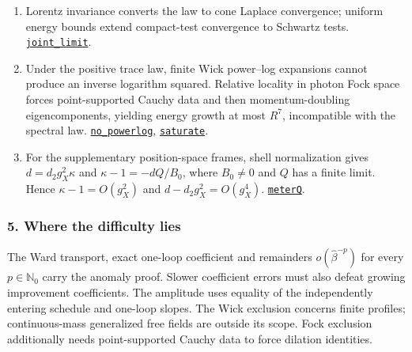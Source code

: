 \documentclass[
  letterpaper,
  11pt]{article}
\begin{document}
\begin{enumerate}
  monotonicity removes lattice rounding and the subsequence principle
  gives the full limit.
  \href{https://github.com/yang-mills-group/OpenAI-YM-20261028/blob/3456e5e75cf8d4cd558955a5c7638fba2d68f464/YM/TraceExtension/Verse/Cape.lean\#L77-L88}{\texttt{outside}}.
\item
  Lorentz invariance converts the law to cone Laplace convergence;
  uniform energy bounds extend compact-test convergence to Schwartz
  tests.
  \href{https://github.com/yang-mills-group/OpenAI-YM-20261028/blob/3456e5e75cf8d4cd558955a5c7638fba2d68f464/YM/TraceExtension/LogScaling.lean\#L216-L222}{\texttt{joint\_limit}}.
\item
  Under the positive trace law, finite Wick power--log expansions cannot
  produce an inverse logarithm squared. Relative locality in photon Fock
  space forces point-supported Cauchy data and then momentum-doubling
  eigencomponents, yielding energy growth at most \(R^7\), incompatible
  with the spectral law.
  \href{https://github.com/yang-mills-group/OpenAI-YM-20261028/blob/3456e5e75cf8d4cd558955a5c7638fba2d68f464/YM/TraceExtension/Wick/Log.lean\#L96-L108}{\texttt{no\_powerlog}},
  \href{https://github.com/yang-mills-group/OpenAI-YM-20261028/blob/3456e5e75cf8d4cd558955a5c7638fba2d68f464/YM/TraceExtension/Fock/Conclude.lean\#L33-L44}{\texttt{saturate}}.
\item
  For the supplementary position-space frames, shell normalization gives
  \(d=d_2g_X^2\kappa\) and \(\kappa-1=-dQ/B_0\), where \(B_0\ne0\) and
  \(Q\) has a finite limit. Hence \(\kappa-1=O(g_X^2)\) and
  \(d-d_2g_X^2=O(g_X^4)\).
  \href{https://github.com/yang-mills-group/OpenAI-YM-20261028/blob/3456e5e75cf8d4cd558955a5c7638fba2d68f464/YM/TraceExtension/Sundial/Noon.lean\#L50-L83}{\texttt{meterQ}}.
\end{enumerate}

\subsubsection{5. Where the difficulty
lies}\label{where-the-difficulty-lies-26}

The Ward transport, exact one-loop coefficient and remainders
\(o(\hat\beta^{-p})\) for every \(p\in\mathbb N_0\) carry the anomaly
proof. Slower coefficient errors must also defeat growing improvement
coefficients. The amplitude uses equality of the independently entering
schedule and one-loop slopes. The Wick exclusion concerns finite
profiles; continuous-mass generalized free fields are outside its scope.
Fock exclusion additionally needs point-supported Cauchy data to force
dilation identities.
\end{document}
